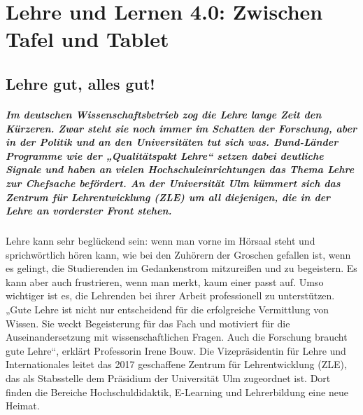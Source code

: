 \chapter[Lehre 4.0]{Lehre und Lernen 4.0: Zwischen Tafel und Tablet}

\section{Lehre gut, alles gut!}
\label{sec:1}
\paragraph{Im deutschen Wissenschaftsbetrieb zog die Lehre lange Zeit den Kürzeren. Zwar steht sie noch immer im Schatten der Forschung, aber in der Politik und an den Universitäten tut sich was. Bund-Länder Programme wie der „Qualitätspakt Lehre“ setzen dabei deutliche Signale und haben an vielen Hochschuleinrichtungen das Thema Lehre zur Chefsache befördert. An der Universität Ulm kümmert sich das Zentrum für Lehrentwicklung (ZLE) um all diejenigen, die in der Lehre an vorderster Front stehen.}

Lehre kann sehr beglückend sein: wenn man vorne im Hörsaal steht und sprichwörtlich hören kann, wie bei den Zuhörern der Groschen gefallen ist, wenn es gelingt, die Studierenden im Gedankenstrom mitzureißen und zu begeistern. Es kann aber auch frustrieren, wenn man merkt, kaum einer passt auf. Umso wichtiger ist es, die Lehrenden bei ihrer Arbeit professionell zu unterstützen. „Gute Lehre ist nicht nur entscheidend für die erfolgreiche Vermittlung von Wissen. Sie weckt Begeisterung für das Fach und motiviert für die Auseinandersetzung mit wissenschaftlichen Fragen. Auch die Forschung braucht gute Lehre“, erklärt Professorin Irene Bouw. Die Vizepräsidentin für Lehre und Internationales leitet das 2017 geschaffene Zentrum für Lehrentwicklung (ZLE), das als Stabsstelle dem Präsidium der Universität Ulm zugeordnet ist. Dort finden die Bereiche Hochschuldidaktik, E-Learning und Lehrerbildung eine neue Heimat.

